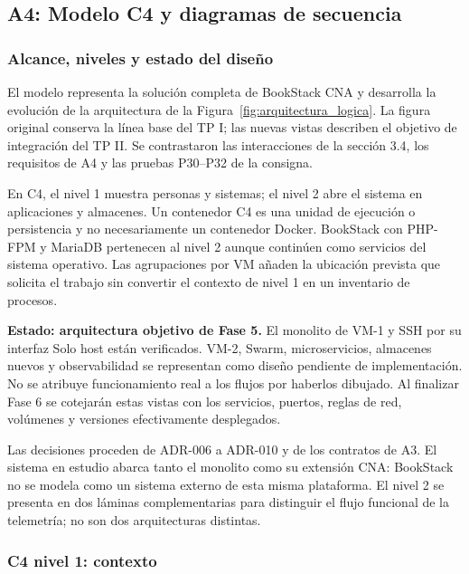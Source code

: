 \clearpage
\subsection{A4: Modelo C4 y diagramas de secuencia}
\label{sec:fase5-a4}

\subsubsection{Alcance, niveles y estado del diseño}

El modelo representa la solución completa de BookStack CNA y desarrolla
la evolución de la arquitectura de la Figura~\ref{fig:arquitectura_logica}.
La figura original conserva la línea base del TP I; las nuevas vistas describen
el objetivo de integración del TP II. Se contrastaron las interacciones de la
sección 3.4, los requisitos de A4 y las pruebas P30--P32 de la consigna.

En C4, el nivel 1 muestra personas y sistemas; el nivel 2 abre el sistema
en aplicaciones y almacenes. Un contenedor C4 es una unidad de ejecución o
persistencia y no necesariamente un contenedor Docker. BookStack con PHP-FPM
y MariaDB pertenecen al nivel 2 aunque continúen como servicios del sistema
operativo. Las agrupaciones por VM añaden la ubicación prevista que solicita
el trabajo sin convertir el contexto de nivel 1 en un inventario de procesos.

\textbf{Estado: arquitectura objetivo de Fase 5.} El monolito de VM-1 y SSH
por su interfaz Solo host están verificados. VM-2, Swarm, microservicios,
almacenes nuevos y observabilidad se representan como diseño pendiente de
implementación. No se atribuye funcionamiento real a los flujos por haberlos
dibujado. Al finalizar Fase 6 se cotejarán estas vistas con los servicios,
puertos, reglas de red, volúmenes y versiones efectivamente desplegados.

Las decisiones proceden de ADR-006 a ADR-010 y de los contratos de A3.
El sistema en estudio abarca tanto el monolito como su extensión CNA:
BookStack no se modela como un sistema externo de esta misma plataforma.
El nivel 2 se presenta en dos láminas complementarias para distinguir el
flujo funcional de la telemetría; no son dos arquitecturas distintas.

\subsubsection{C4 nivel 1: contexto}

